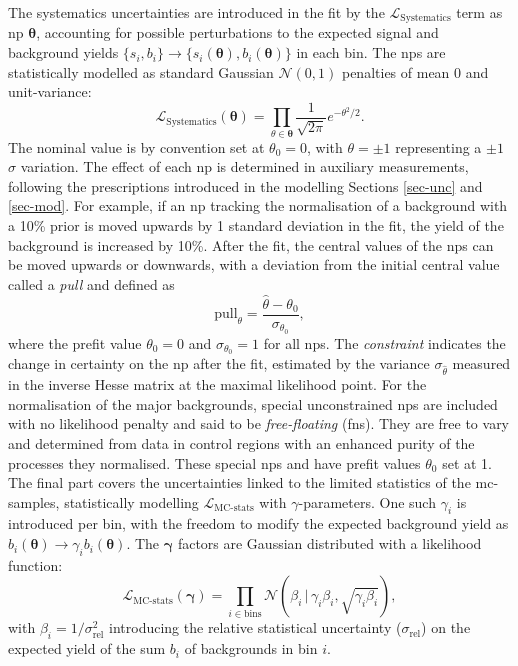 The systematics uncertainties are introduced in the fit by the $\mathcal{L}_{\text{Systematics}}$ term as \gls{np} $\boldsymbol{\theta}$, accounting for possible perturbations to the expected signal and background yields $\{s_i, b_i\} \rightarrow \{s_i(\boldsymbol{\theta}), b_i(\boldsymbol{\theta})\}$ in each bin. The \glspl{np} are statistically modelled as standard Gaussian $\mathcal{N}(0, 1)$ penalties of mean 0 and unit-variance: \[ \mathcal{L}_{\text{Systematics}}(\boldsymbol{\theta}) = \prod_{\theta \in \boldsymbol{\theta}} \frac{1}{\sqrt{2\pi}} e^{- \theta^2/2}.\] The nominal value is by convention set at $\theta_0 = 0$, with $\theta = \pm 1$ representing a $\pm1$ $\sigma$ variation. The effect of each \gls{np} is determined in auxiliary measurements, following the prescriptions introduced in the modelling Sections \ref{sec-unc} and \ref{sec-mod}. For example, if an \gls{np} tracking the normalisation of a background with a 10\% prior is moved upwards by 1 standard deviation in the fit, the yield of the background is increased by 10\%. After the fit, the central values of the \glspl{np} can be moved upwards or downwards, with a deviation from the initial central value called a \textit{pull} and defined as \[ \text{pull}_{\theta} = \frac{\hat{\theta} - \theta_0}{\sigma_{\theta_0}}, \] where the prefit value $\theta_0 = 0 $ and $\sigma_{\theta_0} = 1$ for all \glspl{np}. The \textit{constraint} indicates the change in certainty on the \gls{np} after the fit, estimated by the variance $\sigma_{\hat{\theta}}$ measured in the inverse Hesse matrix at the maximal likelihood point. For the normalisation of the major backgrounds, special unconstrained \glspl{np} are included with no likelihood penalty and said to be \textit{free-floating} (\glspl{fn}). They are free to vary and determined from data in control regions with an enhanced purity of the processes they normalised. These special \glspl{np} and have prefit values $\theta_0$ set at 1. \\

The final part covers the uncertainties linked to the limited statistics of the \gls{mc}-samples, statistically modelling $\mathcal{L}_{\text{MC-stats}}$ with $\gamma$-parameters. One such $\gamma_i$ is introduced per bin, with the freedom to modify the expected background yield as $b_i(\boldsymbol{\theta}) \rightarrow \gamma_i b_i(\boldsymbol{\theta})$. The $\boldsymbol{\gamma}$ factors are Gaussian distributed with a likelihood function: \[\mathcal{L}_{\text{MC-stats}}(\boldsymbol{\gamma}) = \prod_{i\in \textrm{bins}} \mathcal{N} \left(\beta_i \,|\, \gamma_i\beta_i, \sqrt{\gamma_i\beta_i} \right),\] with $\beta_i = 1 / \sigma_{\text{rel}}^2$ introducing the relative statistical uncertainty ($\sigma_{\text{rel}}$) on the expected yield of the sum $b_i$ of backgrounds in bin $i$. \\

